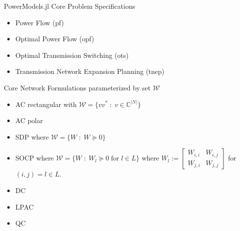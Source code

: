 \documentclass[xcolor=dvipsnames]{beamer}
\newcommand{\WW}{W}
\newcommand{\WSet}{\mathcal{W}}
\begin{document}
\begin{frame}{PowerModels.jl}
Core Problem Specifications
\begin{itemize}
\item Power Flow (pf)
\item Optimal Power Flow (opf)
\item Optimal Transmission Switching (ots)
\item Transmission Network Expansion Planning (tnep)
\end{itemize}
Core Network Formulations parameterized by set $\WSet$
\begin{itemize}
\item AC rectangular with $\WSet = \{ v v^* \; : \; v \in \mathbb{C}^{|N|}\}$
\item AC polar %
\item SDP where $\WSet = \{ \WW \; : \; \WW \succeq 0\}$
\item SOCP where $\WSet = \{ \WW \; : \; \WW_l \succeq 0\;\text{for}\; l \in L\}$ where $\WW_l := \left[\begin{array}{cc} \WW_{i,i} & \WW_{i,j} \\ \WW_{j,i} & \WW_{j,j} \end{array}\right]$ for $(i,j)=l \in L$.
\item DC 
\item LPAC
\item QC
\end{itemize}
\end{frame}
\end{document}
